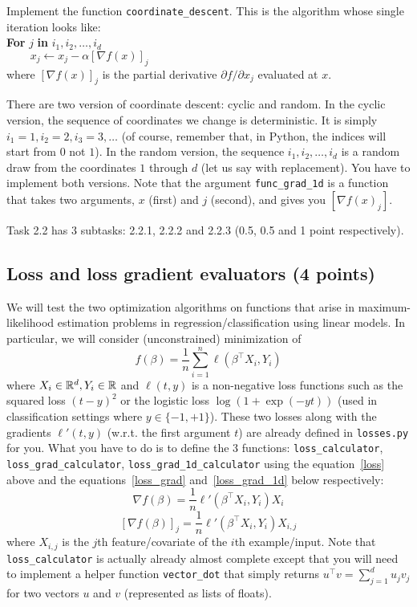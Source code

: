 \documentclass{article}
\begin{document}
Implement the function {\tt coordinate\_descent}. This is the algorithm whose single iteration looks like:\\

\noindent
{\bf For} $j$ {\bf in} $i_1, i_2, \ldots, i_d$ \\
$\phantom{aaaa} x_j \gets x_j - \alpha [\nabla f(x)]_j$\\

\noindent
where $[\nabla f(x)]_j$ is the partial derivative $\partial f/\partial x_j$ evaluated at $x$.

There are two version of coordinate descent: cyclic and random. In the cyclic version, the sequence of coordinates we change is deterministic. It is simply $i_1=1,
i_2=2, i_3=3, \ldots$ (of course, remember that, in Python, the indices will start from $0$ not $1$).
In the random version, the sequence $i_1, i_2, \ldots, i_d$ is a random draw from the coordinates $1$ through $d$ (let us say with replacement). You have to implement
both versions. Note that the argument {\tt func\_grad\_1d} is a function that takes two arguments, $x$ (first) and $j$ (second), and gives you $[\nabla f(x)_j]$.

Task 2.2 has 3 subtasks: 2.2.1, 2.2.2 and 2.2.3 (0.5, 0.5 and 1 point respectively).

\subsection{Loss and loss gradient evaluators (4 points)}

We will test the two optimization algorithms on functions that arise in maximum-likelihood estimation problems in regression/classification using linear models.
In particular, we will consider (unconstrained) minimization of
\begin{equation}\label{loss}
f(\beta) = \frac{1}{n} \sum_{i=1}^n \ell(\beta^\top X_i, Y_i)
\end{equation}
where $X_i \in \mathbb{R}^d, Y_i \in \mathbb{R}$ and $\ell(t, y)$ is a non-negative loss functions such as the squared loss $(t-y)^2$ or the logistic loss
$\log(1+\exp(-yt))$ (used in classification settings where $y \in \{-1,+1\}$). These two losses along with the gradients $\ell'(t,y)$ (w.r.t. the first argument $t$)
are already defined in {\tt losses.py} for you. What you have to do is to define the 3 functions: {\tt loss\_calculator}, {\tt loss\_grad\_calculator},
{\tt loss\_grad\_1d\_calculator} using the equation~\eqref{loss} above and the equations~\eqref{loss_grad} and~\eqref{loss_grad_1d} below respectively:
\begin{equation}\label{loss_grad}
\nabla f(\beta) = \frac{1}{n} \ell'(\beta^\top X_i, Y_i) X_i
\end{equation}
\begin{equation}\label{loss_grad_1d}
[\nabla f(\beta)]_j = \frac{1}{n} \ell'(\beta^\top X_i, Y_i) X_{i,j}
\end{equation}
where $X_{i,j}$ is the $j$th feature/covariate of the $i$th example/input. Note that {\tt loss\_calculator} is actually already almost complete except that you will
need to implement a helper function {\tt vector\_dot} that simply returns
$u^\top v = \sum_{j=1}^d u_jv_j$ for two vectors $u$ and $v$ (represented as lists of floats).
\end{document}
